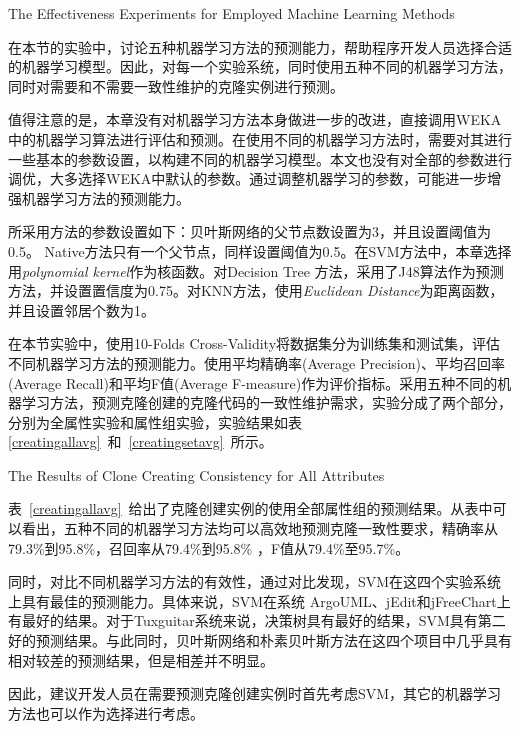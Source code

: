 {The Effectiveness Experiments for Employed Machine Learning Methods}

在本节的实验中，讨论五种机器学习方法的预测能力，帮助程序开发人员选择合适的机器学习模型。因此，对每一个实验系统，同时使用五种不同的机器学习方法，同时对需要和不需要一致性维护的克隆实例进行预测。

值得注意的是，本章没有对机器学习方法本身做进一步的改进，直接调用WEKA中的机器学习算法进行评估和预测。在使用不同的机器学习方法时，需要对其进行一些基本的参数设置，以构建不同的机器学习模型。本文也没有对全部的参数进行调优，大多选择WEKA中默认的参数。通过调整机器学习的参数，可能进一步增强机器学习方法的预测能力。

所采用方法的参数设置如下：贝叶斯网络的父节点数设置为3，并且设置阈值为0.5。 Native方法只有一个父节点，同样设置阈值为0.5。在SVM方法中，本章选择用{\em polynomial kernel\/}作为核函数。对Decision Tree 方法，采用了J48算法作为预测方法，并设置置信度为0.75。对KNN方法，使用{\em Euclidean Distance\/}为距离函数，并且设置邻居个数为1。

在本节实验中，使用10-Folds Cross-Validity将数据集分为训练集和测试集，评估不同机器学习方法的预测能力。使用平均精确率(Average Precision)、平均召回率(Average Recall)和平均F值(Average F-measure)作为评价指标。采用五种不同的机器学习方法，预测克隆创建的克隆代码的一致性维护需求，实验分成了两个部分，分别为全属性实验和属性组实验，实验结果如表\ref{creatingallavg}~和~\ref{creatingsetavg}~所示。

{The Results of Clone Creating Consistency for All Attributes}

表~\ref{creatingallavg}~给出了克隆创建实例的使用全部属性组的预测结果。从表中可以看出，五种不同的机器学习方法均可以高效地预测克隆一致性要求，精确率从79.3\%到95.8\%，召回率从79.4\%到95.8\% ，F值从79.4\%至95.7\%。

同时，对比不同机器学习方法的有效性，通过对比发现，SVM在这四个实验系统上具有最佳的预测能力。具体来说，SVM在系统 ArgoUML、jEdit和jFreeChart上有最好的结果。对于{Tuxguitar}系统来说，决策树具有最好的结果，SVM具有第二好的预测结果。与此同时，贝叶斯网络和朴素贝叶斯方法在这四个项目中几乎具有相对较差的预测结果，但是相差并不明显。

因此，建议开发人员在需要预测克隆创建实例时首先考虑SVM，其它的机器学习方法也可以作为选择进行考虑。

